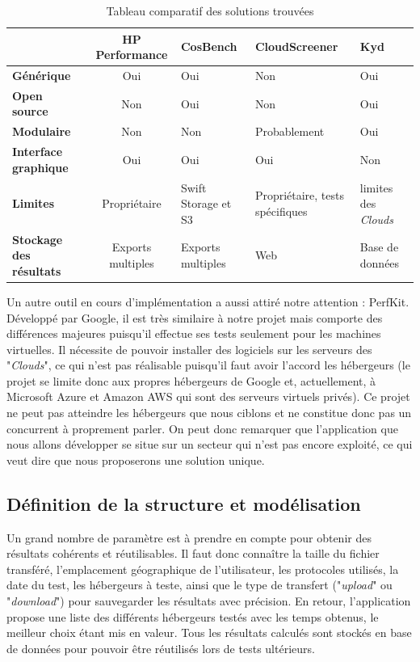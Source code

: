 \documentclass[10pt]{article}
\begin{document}
\begin{table}[h]
\caption{Tableau comparatif des solutions trouvées}
\renewcommand{\arraystretch}{1.5}
\begin{center}
\begin{tabular}{|p{2cm}|c|p{2cm}|p{3cm}|p{2cm}|}
 \hline
     & \bf HP Performance & \bf CosBench & \bf CloudScreener & \bf Kyd  \\
 \hline
 \bf\centering Générique & Oui & Oui & Non & Oui \\
 \hline
  \bf\centering Open source & Non & Oui & Non & Oui \\
 \hline
  \bf\centering Modulaire & Non & Non & Probablement & Oui \\
 \hline
  \bf\centering Interface graphique & Oui & Oui & Oui & Non \\
 \hline
  \bf\centering Limites & Propriétaire & Swift Storage et S3 & Propriétaire, tests spécifiques & limites des \textit{Clouds} \\
 \hline
  \bf\centering Stockage des résultats & Exports multiples & Exports multiples & Web & Base de données \\
 \hline
\end{tabular}
\end{center}
\end{table}

Un autre outil en cours d'implémentation a aussi attiré notre attention : PerfKit. Développé par Google, il est très similaire à notre projet mais comporte des différences majeures puisqu'il effectue ses tests seulement pour les machines virtuelles. Il nécessite de pouvoir installer des logiciels sur les serveurs des "\textit{Clouds}", ce qui n'est pas réalisable puisqu'il faut avoir l'accord les hébergeurs (le projet se limite donc aux propres hébergeurs de Google et, actuellement, à Microsoft Azure et Amazon AWS qui sont des serveurs virtuels privés). Ce projet ne peut pas atteindre les hébergeurs que nous ciblons et ne constitue donc pas un concurrent à proprement parler. On peut donc remarquer que l’application que nous allons développer se situe sur un secteur qui n’est pas encore exploité, ce qui veut dire que nous proposerons une solution unique.

\subsection{Définition de la structure et modélisation}

Un grand nombre de paramètre est à prendre en compte pour obtenir des résultats cohérents et réutilisables. Il faut donc connaître la taille du fichier transféré, l'emplacement géographique de l'utilisateur, les protocoles utilisés, la date du test, les hébergeurs à teste, ainsi que le type de transfert ("\textit{upload}" ou "\textit{download}") pour sauvegarder les résultats avec précision. En retour, l'application propose une liste des différents hébergeurs testés avec les temps obtenus, le meilleur choix étant mis en valeur. Tous les résultats calculés sont stockés en base de données pour pouvoir être réutilisés lors de tests ultérieurs.
\end{document}

